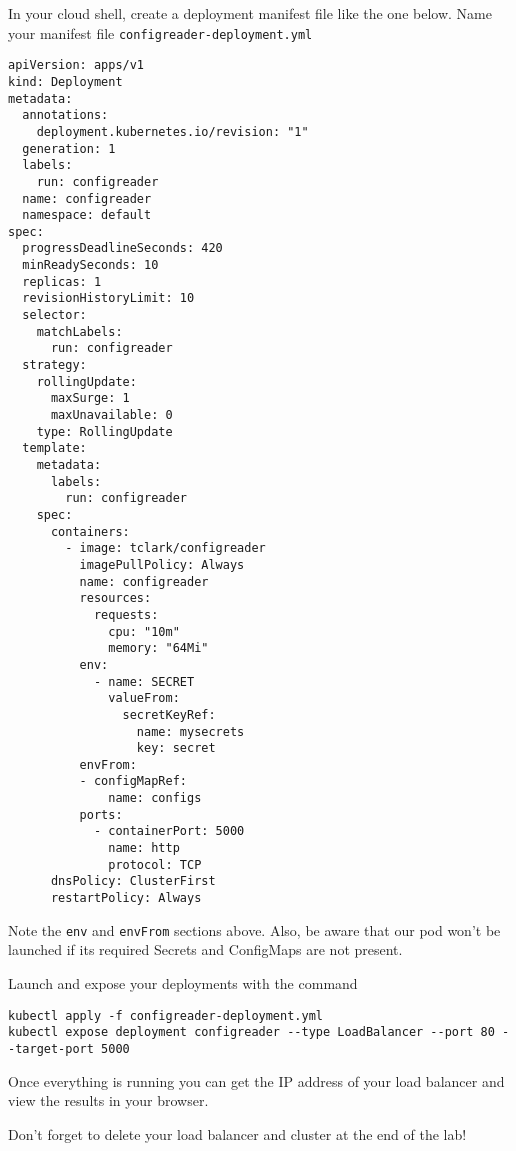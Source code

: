 \documentclass{article}
\begin{document}
In your cloud shell, create a deployment manifest file like the one below.
Name your manifest file \texttt{configreader-deployment.yml}
\begin{verbatim}
apiVersion: apps/v1
kind: Deployment
metadata:
  annotations:
    deployment.kubernetes.io/revision: "1"
  generation: 1
  labels:
    run: configreader
  name: configreader
  namespace: default
spec:
  progressDeadlineSeconds: 420
  minReadySeconds: 10
  replicas: 1
  revisionHistoryLimit: 10
  selector:
    matchLabels:
      run: configreader
  strategy:
    rollingUpdate:
      maxSurge: 1
      maxUnavailable: 0
    type: RollingUpdate
  template:
    metadata:
      labels:
        run: configreader
    spec:
      containers:
        - image: tclark/configreader
          imagePullPolicy: Always
          name: configreader
          resources: 
            requests:
              cpu: "10m"
              memory: "64Mi"
          env:
            - name: SECRET
              valueFrom:
                secretKeyRef:
                  name: mysecrets
                  key: secret
          envFrom:
          - configMapRef:
              name: configs
          ports:
            - containerPort: 5000
              name: http
              protocol: TCP
      dnsPolicy: ClusterFirst
      restartPolicy: Always
\end{verbatim}

Note the \texttt{env} and \texttt{envFrom} sections above. Also, be aware that our pod won't be launched if its required Secrets and ConfigMaps are not present.

Launch and expose your deployments with the command
\begin{verbatim}
kubectl apply -f configreader-deployment.yml
kubectl expose deployment configreader --type LoadBalancer --port 80 --target-port 5000
\end{verbatim}

Once everything is running you can get the IP address of your load balancer and view the results in your browser.


Don't forget to delete your load balancer and cluster at the end of the lab!  
\end{document}
